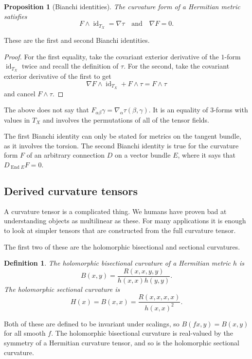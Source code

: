 \documentclass[11pt]{article}
\newtheorem{prop}[theo]{Proposition}
\newtheorem{defi}[theo]{Definition}
\newtheorem*{proof}{Proof}
\DeclareMathOperator{\End}{End}
\DeclareMathOperator{\id}{id}
\begin{document}
\begin{prop}[Bianchi identities]
The curvature form of a Hermitian metric satisfies
$$
F \wedge \id_{T_X} = \nabla \tau
\quad\text{and}\quad
\nabla F = 0.
$$
\end{prop}

These are the first and second Bianchi identities.

\begin{proof}
  For the first equality, take the covariant exterior derivative of the $1$-form $\id_{T_X}$ twice and recall the definition of $\tau$. For the second, take the covariant exterior derivative of the first to get
$$
\nabla F \wedge \id_{T_X} + F \wedge \tau = F \wedge \tau
$$
and cancel $F \wedge \tau$.
\end{proof}


The above does not say that $F_{\alpha\beta}\gamma = \nabla_\alpha \tau(\beta,\gamma)$. It is an equality of $3$-forms with values in $T_X$ and involves the permutations of all of the tensor fields.

The first Bianchi identity can only be stated for metrics on the tangent bundle, as it involves the torsion. The second Bianchi identity is true for the curvature form $F$ of an arbitrary connection $D$ on a vector bundle $E$, where it says that $D_{\End E} F = 0$.


\subsection{Derived curvature tensors}


A curvature tensor is a complicated thing. We humans have proven bad at understanding objects as multilinear as these. For many applications it is enough to look at simpler tensors that are constructed from the full curvature tensor.

The first two of these are the holomorphic bisectional and sectional curvatures.

\begin{defi}
  The \emph{holomorphic bisectional curvature} of a Hermitian metric $h$ is
$$
B(x,y) = \frac{R(x,x,y,y)}{h(x,x)h(y,y)}.
$$
The \emph{holomorphic sectional curvature} is
$$
H(x) = B(x,x) = \frac{R(x,x,x,x)}{h(x,x)^2}.
$$
\end{defi}

Both of these are defined to be invariant under scalings, so $B(fx,y) = B(x,y)$ for all smooth $f$. The holomorphic bisectional curvature is real-valued by the symmetry of a Hermitian curvature tensor, and so is the holomorphic sectional curvature.
\end{document}

